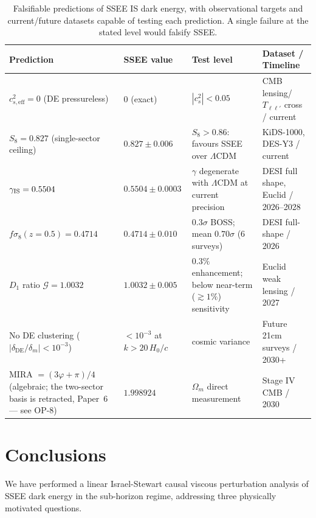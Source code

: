 \documentclass[12pt,a4paper]{article}
\begin{document}
\begin{table}[h!]
\centering
\caption{Falsifiable predictions of SSEE IS dark energy, with observational
  targets and current/future datasets capable of testing each prediction.
  A single failure at the stated level would falsify SSEE.}
\label{tab:falsifiable}
\begin{tabular}{p{4.0cm}p{3.2cm}p{2.2cm}p{4.0cm}}
\toprule
Prediction & SSEE value & Test level & Dataset / Timeline \\
\midrule
$c^2_{s,\mathrm{eff}} = 0$ (DE pressureless) & $0$ (exact) & $|c^2_s| < 0.05$ & CMB lensing/$T_{\ell\ell'}$ cross \citep{Calabrese2011} / current \\
$S_8 = 0.827$ (single-sector ceiling) & $0.827 \pm 0.006$ & $S_8 > 0.86$: favours SSEE over $\Lambda$CDM & KiDS-1000, DES-Y3 / current \\
$\gamma_{\rm IS} = 0.5504$ & $0.5504 \pm 0.0003$ & $\gamma$ degenerate with $\Lambda$CDM at current precision & DESI full shape, Euclid / 2026--2028 \\
$f\sigma_8(z=0.5) = 0.4714$ & $0.4714 \pm 0.010$ & $0.3\sigma$ BOSS; mean $0.70\sigma$ (6 surveys) & DESI full-shape / 2026 \\
$D_1$ ratio $\mathcal{G} = 1.0032$ & $1.0032 \pm 0.005$ & $0.3\%$ enhancement; below near-term ($\gtrsim 1\%$) sensitivity & Euclid weak lensing / 2027 \\
No DE clustering ($|\delta_{\mathrm{DE}}/\delta_m| < 10^{-3}$) & $< 10^{-3}$ at $k > 20\,H_0/c$ & cosmic variance & Future 21cm surveys / 2030+ \\
MIRA $= (3\varphi+\pi)/4$ (algebraic; the two-sector basis is retracted, Paper~6 --- see OP-8) & $1.998924$ & $\Omega_m$ direct measurement & Stage IV CMB / 2030 \\
\bottomrule
\end{tabular}
\end{table}

\section{Conclusions}
\label{sec:conclusions}

We have performed a linear Israel-Stewart causal viscous perturbation analysis
of SSEE dark energy in the sub-horizon regime, addressing three physically motivated questions.
\end{document}
